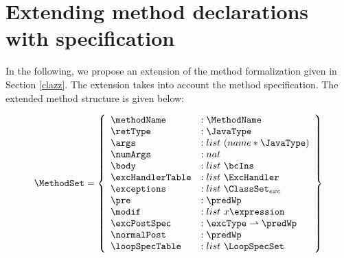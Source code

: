 \section{Extending method declarations with specification}\label{methExtend}

In the following, we propose an extension of the method formalization given in Section \ref{clazz}.
 The extension takes into account the method specification. The extended method structure is given below:

$$ \begin{array}{l} %
                     \MethodSet  = \left\{\begin{array}{ll}  
                                                          \methodName & :\MethodName\\
						          \retType & :\JavaType\\
							  \args &  : list \ (name * \JavaType) \\
							  \numArgs & : nat \\
							  \body &  : list \  \bcIns \\
							  \excHandlerTable & : list \ \ExcHandler  \\
							  \exceptions &  : list \ \ClassSet_{exc}\\
							  \pre & : \predWp \\
							  \modif & :   list \ x\expression \\
							  \excPostSpec & : \excType \rightharpoonup \predWp \\
							  \normalPost & : \predWp \\
                                                          \loopSpecTable & : list \ \LoopSpecSet 
							  
                                     \end{array}  \right\} 
     \end{array} $$

